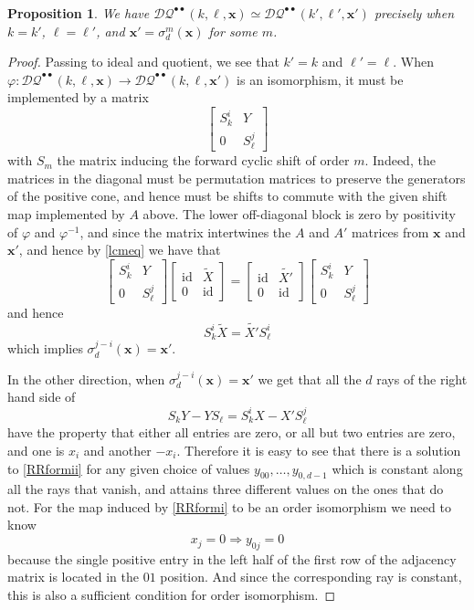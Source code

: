 \documentclass[12pt]{amsbook}%
\renewcommand{\phi}{\varphi}
\newtheorem{propo}[theor]{Proposition}
\theoremstyle{defin}
\theoremstyle{remark}
\numberwithin{equation}{chapter}
\numberwithin{theor}{section}
\newcommand{\DQ}{\mathcal{DQ}}
\newcommand{\id}{\operatorname{id}}
\newcommand{\RRi}{{\bullet\bullet}}
\newcommand{\xx}{\mathbf{x}}
\begin{document}
\begin{propo}\label{RRisostable}
We have $\DQ^\RRi(k,\ell,\xx)\simeq \DQ^\RRi(k',\ell',\xx')$ precisely when $k=k'$, $\ell=\ell'$, and  $\xx'=\sigma_d^m(\xx)$ for some $m$.
\end{propo}
\begin{proof}
Passing to ideal and quotient, we see that $k'=k$ and $\ell'=\ell$. When $\phi:\DQ^\RRi(k,\ell,\xx)\to\DQ^\RRi(k,\ell,\xx')$ is an isomorphism, it must be implemented by a matrix 
\begin{equation}\label{RRformi}
\begin{bmatrix}
S_k^i&Y\\
0&S_\ell^j
\end{bmatrix}
\end{equation}
with $S_m$ the matrix inducing the forward cyclic shift of order $m$. Indeed, the matrices in the diagonal must be permutation matrices to preserve the generators of the positive cone, and hence must be shifts to commute with the given shift map implemented by $A$ above. The lower off-diagonal block is zero by positivity of $\phi$ and $\phi^{-1}$, and since the matrix intertwines the $A$ and $A'$ matrices from $\xx$ and $\xx'$, and hence by \eqref{lcmeq} we have that
\[
\begin{bmatrix}
S_k^i&Y\\
0&S_\ell^j
\end{bmatrix}
\begin{bmatrix}
\id&\widetilde{X}\\
0&\id
\end{bmatrix}
=
\begin{bmatrix}
\id&\widetilde{X'}\\
0&\id
\end{bmatrix}
\begin{bmatrix}
S_k^i&Y\\
0&S_\ell^j
\end{bmatrix}
\]
and hence
\[
S_k^i\widetilde X=\widetilde{X'}S_\ell^i
\]
which implies $\sigma_d^{j-i}(\xx)=\xx'$. 

In the other direction, when $\sigma_d^{j-i}(\xx)=\xx'$ we get that all the $d$ rays of the right hand side of
\begin{equation}\label{RRformii}
S_kY-YS_\ell=S_k^iX-X'S_\ell^j
\end{equation}
have the property that either all entries are zero, or all but two entries are zero, and one is $x_i$ and another $-x_i$. Therefore it is easy to see that there is a solution to \eqref{RRformii} for any given choice of values $y_{00},\dots,y_{0,d-1}$ which is constant along  all the rays that vanish, and attains three different values on the ones that do not. For the map induced by \eqref{RRformi} to be  an order isomorphism we need to know 
\[
x_{j}=0\Longrightarrow y_{0j}=0
\]
because the single positive entry in the left half of the first row of the adjacency matrix is located in the $01$ position. And since the corresponding ray is constant, this is also a sufficient condition for order isomorphism.
\end{proof}
\end{document}
